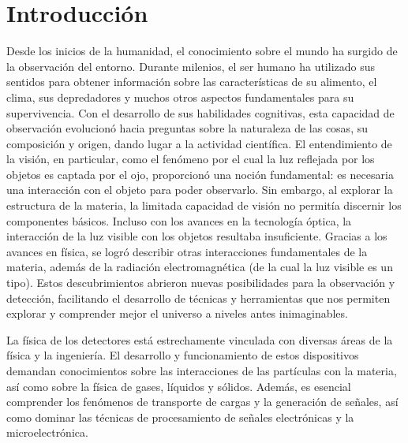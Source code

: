\documentclass[]{book}
\begin{document}
\chapter{Introducción}
Desde los inicios de la humanidad, el conocimiento sobre el mundo ha surgido de la observación del entorno. 
Durante milenios, el ser humano ha utilizado sus sentidos para obtener información sobre las características 
de su alimento, el clima, sus depredadores y muchos otros aspectos fundamentales para su supervivencia. 
Con el desarrollo de sus habilidades cognitivas, esta capacidad de observación evolucionó hacia preguntas
sobre la naturaleza de las cosas, su composición y origen, dando lugar a la actividad científica.
El entendimiento de la visión, en particular, como el fenómeno por el cual la luz reflejada por los objetos 
es captada por el ojo, proporcionó una noción fundamental: es necesaria una interacción con el objeto para 
poder observarlo. Sin embargo, al explorar la estructura de la materia, la limitada capacidad de visión no 
permitía discernir los componentes básicos. Incluso con los avances en la tecnología óptica, la interacción
de la luz visible con los objetos resultaba insuficiente.
Gracias a los avances en física, se logró describir otras interacciones fundamentales de la materia, además 
de la radiación electromagnética (de la cual la luz visible es un tipo). Estos descubrimientos abrieron nuevas
posibilidades para la observación y detección, facilitando el desarrollo de técnicas y herramientas que nos 
permiten explorar y comprender mejor el universo a niveles antes inimaginables.

La física de los detectores está estrechamente vinculada con diversas áreas de la física y la ingeniería. 
El desarrollo y funcionamiento de estos dispositivos demandan conocimientos sobre las interacciones de las 
partículas con la materia, así como sobre la física de gases, líquidos y sólidos. Además, es esencial comprender 
los fenómenos de transporte de cargas y la generación de señales, así como dominar las técnicas de procesamiento 
de señales electrónicas y la microelectrónica.
\end{document}

